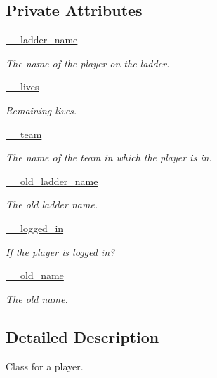 \subsection*{\-Private \-Attributes}
\begin{DoxyCompactItemize}
\item 
\hyperlink{class_player_1_1_player_a27e445a0784d93ee71dd26ae3141b4f1}{\-\_\-\-\_\-ladder\-\_\-name}
\begin{DoxyCompactList}\small\item\em \-The name of the player on the ladder. \end{DoxyCompactList}\item 
\hyperlink{class_player_1_1_player_a2fb60b55b201da99002ab522b4b411ca}{\-\_\-\-\_\-lives}
\begin{DoxyCompactList}\small\item\em \-Remaining lives. \end{DoxyCompactList}\item 
\hyperlink{class_player_1_1_player_ae34308b0c9afe7940cf09f8b29bc5c0f}{\-\_\-\-\_\-team}
\begin{DoxyCompactList}\small\item\em \-The name of the team in which the player is in. \end{DoxyCompactList}\item 
\hyperlink{class_player_1_1_player_acbd98997cb172fdf4ea5a44428231462}{\-\_\-\-\_\-old\-\_\-ladder\-\_\-name}
\begin{DoxyCompactList}\small\item\em \-The old ladder name. \end{DoxyCompactList}\item 
\hyperlink{class_player_1_1_player_a4144fc592e3ff9122bd4cbc230fac652}{\-\_\-\-\_\-logged\-\_\-in}
\begin{DoxyCompactList}\small\item\em \-If the player is logged in? \end{DoxyCompactList}\item 
\hyperlink{class_player_1_1_player_a2d57645ad97f96d154bf84ae7237767d}{\-\_\-\-\_\-old\-\_\-name}
\begin{DoxyCompactList}\small\item\em \-The old name. \end{DoxyCompactList}\end{DoxyCompactItemize}


\subsection{\-Detailed \-Description}
\-Class for a player. 

